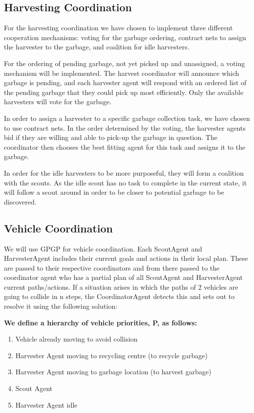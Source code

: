 \subsection{Harvesting Coordination}

For the harvesting coordination we have chosen to implement three different cooperation mechanisms: voting for the garbage ordering, contract nets to assign the harvester to the garbage, and coalition for idle harvesters. 

For the ordering of pending garbage, not yet picked up and unassigned, a voting mechanism will be implemented. The harvest coordinator will announce which garbage is pending, and each harvester agent will respond with an ordered list of the pending garbage that they could pick up most efficiently. Only the available harvesters will vote for the garbage. 

In order to assign a harvester to a specific garbage collection task, we have chosen to use contract nets. In the order determined by the voting, the harvester agents bid if they are willing and able to pick-up the garbage in question. The coordinator then chooses the best fitting agent for this task and assigns it to the garbage. 

In order for the idle harvesters to be more purposeful, they will form a coalition with the scouts. As the idle scout has no task to complete in the current state, it will follow a scout around in order to be closer to potential garbage to be discovered. 

\subsection{Vehicle Coordination}

We will use GPGP for vehicle coordination. Each ScoutAgent and HarvesterAgent includes their current goals and actions in their local plan. These are passed to their respective coordinators and from there passed to the coordinator agent who has a partial plan of all ScoutAgent and HarvesterAgent current paths/actions. If a situation arises in which the paths of 2 vehicles are going to collide in n steps, the CoordinatorAgent detects this and sets out to resolve it using the following solution:

\textbf{We define a hierarchy of vehicle priorities, P, as follows:}

\begin{enumerate}
	\item Vehicle already moving to avoid collision
	\item Harvester Agent moving to recycling centre (to recycle garbage)
	\item Harvester Agent moving to garbage location (to harvest garbage)
	\item Scout Agent 
	\item Harvester Agent idle 
\end{enumerate}

